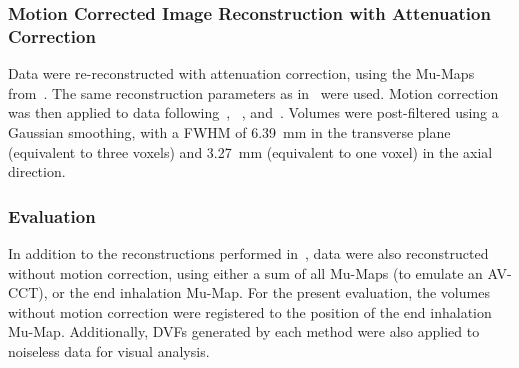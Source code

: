             \subsubsection{Motion Corrected Image Reconstruction with Attenuation Correction} \label{sec:comparison_of_motion_correction_methods_incorporating_motion_modelling_for_pet_ct_using_a_single_breath_hold_attenuation_map_attenuation_corrected_image_reconstruction}
                Data were re-reconstructed with attenuation correction, using the \glspl{Mu-Map} from~. The same reconstruction parameters as in~ were used. Motion correction was then applied to data following~, ~, and~. Volumes were post-filtered using a Gaussian smoothing, with a \gls{FWHM} of \SI{6.39}{\milli\metre} in the transverse plane (equivalent to three voxels) and \SI{3.27}{\milli\metre} (equivalent to one voxel) in the axial direction.
            
            \subsubsection{Evaluation} \label{sec:comparison_of_motion_correction_methods_incorporating_motion_modelling_for_pet_ct_using_a_single_breath_hold_attenuation_map_evaluation}
                In addition to the reconstructions performed in~, data were also reconstructed without motion correction, using either a sum of all \glspl{Mu-Map} (to emulate an \gls{AV-CCT}), or the end inhalation \gls{Mu-Map}. For the present evaluation, the volumes without motion correction were registered to the position of the end inhalation \gls{Mu-Map}. Additionally, \glspl{DVF} generated by each method were also applied to noiseless data for visual analysis.
                
